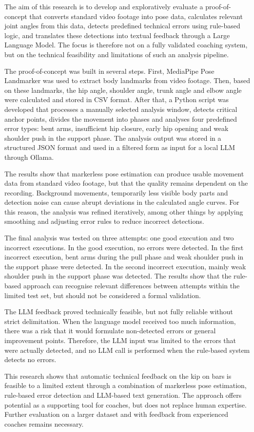 The aim of this research is to develop and exploratively evaluate a proof-of-concept that converts standard video footage into pose data, calculates relevant joint angles from this data, detects predefined technical errors using rule-based logic, and translates these detections into textual feedback through a Large Language Model. The focus is therefore not on a fully validated coaching system, but on the technical feasibility and limitations of such an analysis pipeline.

The proof-of-concept was built in several steps. First, MediaPipe Pose Landmarker was used to extract body landmarks from video footage. Then, based on these landmarks, the hip angle, shoulder angle, trunk angle and elbow angle were calculated and stored in CSV format. After that, a Python script was developed that processes a manually selected analysis window, detects critical anchor points, divides the movement into phases and analyses four predefined error types: bent arms, insufficient hip closure, early hip opening and weak shoulder push in the support phase. The analysis output was stored in a structured JSON format and used in a filtered form as input for a local LLM through Ollama.

The results show that markerless pose estimation can produce usable movement data from standard video footage, but that the quality remains dependent on the recording. Background movements, temporarily less visible body parts and detection noise can cause abrupt deviations in the calculated angle curves. For this reason, the analysis was refined iteratively, among other things by applying smoothing and adjusting error rules to reduce incorrect detections.

The final analysis was tested on three attempts: one good execution and two incorrect executions. In the good execution, no errors were detected. In the first incorrect execution, bent arms during the pull phase and weak shoulder push in the support phase were detected. In the second incorrect execution, mainly weak shoulder push in the support phase was detected. The results show that the rule-based approach can recognise relevant differences between attempts within the limited test set, but should not be considered a formal validation.

The LLM feedback proved technically feasible, but not fully reliable without strict delimitation. When the language model received too much information, there was a risk that it would formulate non-detected errors or general improvement points. Therefore, the LLM input was limited to the errors that were actually detected, and no LLM call is performed when the rule-based system detects no errors.

This research shows that automatic technical feedback on the kip on bars is feasible to a limited extent through a combination of markerless pose estimation, rule-based error detection and LLM-based text generation. The approach offers potential as a supporting tool for coaches, but does not replace human expertise. Further evaluation on a larger dataset and with feedback from experienced coaches remains necessary.




